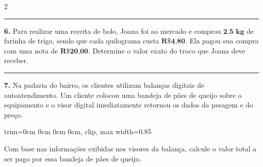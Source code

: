 \documentclass[twoside, 10pt, a4paper]{article}
\newlength{\espacoPreQuestao}\setlength{\espacoPreQuestao}{0.1cm}
\newlength{\espacoQuestao}\setlength{\espacoQuestao}{0.2cm}
\newcommand{\larguraTikz}{0.85\linewidth}
\begin{document}
\begin{multicols*}{2}
\noindent\textcolor{CorLinha}{\rule{\linewidth}{0.5pt}} 
\par\vspace{\espacoPreQuestao}
\textbf{6.} Para realizar uma receita de bolo, Joana foi ao mercado e comprou $ \textbf{2,5 kg} $ de farinha de trigo, sendo que cada quilograma custa $ \textbf{R\$ 4,80} $. Ela pagou sua compra com uma nota de $ \textbf{R\$ 20,00} $. Determine o valor exato do troco que Joana deve receber.
\par\vspace{\espacoQuestao}

\noindent\textcolor{CorLinha}{\rule{\linewidth}{0.5pt}} 
\par\vspace{\espacoPreQuestao}
\textbf{7.} Na padaria do bairro, os clientes utilizam balanças digitais de autoatendimento. Um cliente colocou uma bandeja de pães de queijo sobre o equipamento e o visor digital imediatamente retornou os dados da pesagem e do preço.
\begin{center}
\begin{adjustbox}{trim=0cm 0cm 0cm 0cm, clip, max width=\larguraTikz}
\end{adjustbox}
\end{center}
Com base nas informações exibidas nos visores da balança, calcule o valor total a ser pago por essa bandeja de pães de queijo.
\par\vspace{\espacoQuestao}


\end{multicols*}
\end{document}
